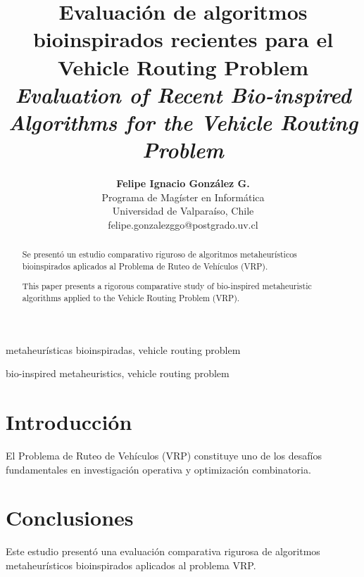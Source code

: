 \documentclass[conference,a4paper]{IEEEtran}
\title{Evaluación de algoritmos bioinspirados recientes para el Vehicle Routing Problem
\\ \textit{Evaluation of Recent Bio-inspired Algorithms for the Vehicle Routing Problem}}
\author{%
  \begin{tabular}{c}
    \textbf{Felipe Ignacio González G.}\\
    Programa de Magíster en Informática\\
    Universidad de Valparaíso, Chile\\
    felipe.gonzalezggo@postgrado.uv.cl
  \end{tabular}}
\begin{document}
\maketitle

\begin{abstract}
Se presentó un estudio comparativo riguroso de algoritmos metaheurísticos bioinspirados aplicados al Problema de Ruteo de Vehículos (VRP).
\end{abstract}

\begin{IEEEkeywords}
metaheurísticas bioinspiradas, vehicle routing problem
\end{IEEEkeywords}

\begin{abstract}
This paper presents a rigorous comparative study of bio-inspired metaheuristic algorithms applied to the Vehicle Routing Problem (VRP).
\end{abstract}

\begin{IEEEkeywords}
bio-inspired metaheuristics, vehicle routing problem
\end{IEEEkeywords}


\section{Introducción}
El Problema de Ruteo de Vehículos (VRP) constituye uno de los desafíos fundamentales en investigación operativa y optimización combinatoria.

\section{Conclusiones}
Este estudio presentó una evaluación comparativa rigurosa de algoritmos metaheurísticos bioinspirados aplicados al problema VRP.
\end{document}
